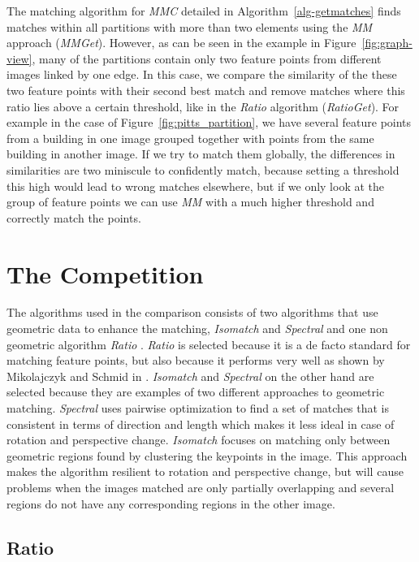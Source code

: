 The matching algorithm for \emph{MMC} detailed in 
Algorithm~\ref{alg-getmatches} finds matches within all partitions with 
more than two elements using the \emph{MM} approach (\emph{MMGet}).  
However, as can be seen in the example in Figure~\ref{fig:graph-view}, 
many of the partitions contain only two feature points from different 
images linked by one edge. In this case, we compare the similarity of 
the these two feature points with their second best match and remove 
matches where this ratio lies above a certain threshold, like in the 
\emph{Ratio} algorithm (\emph{RatioGet}).  For example in the case of 
Figure~\ref{fig:pitts_partition}, we have several feature points from a 
building in one image grouped together with points from the same 
building in another image. If we try to match them globally, the 
differences in similarities are two miniscule to confidently match, 
because setting a threshold this high would lead to wrong matches 
elsewhere, but if we only look at the group of feature points we can use 
\emph{MM} with a much higher threshold and correctly match the points.

\section{The Competition}

The algorithms used in the comparison consists of two algorithms that 
use geometric data to enhance the matching, \emph{Isomatch} 
\cite{das2008event} and \emph{Spectral} \cite{leordeanu2005spectral} and 
one non geometric algorithm \emph{Ratio} \cite{lowe2004sift}.  
\emph{Ratio} is selected because it is a de facto standard for matching 
feature points, but also because it performs very well as shown by 
Mikolajczyk and Schmid in \cite{mikolajczyk2005performance}.  
\emph{Isomatch} and \emph{Spectral} on the other hand are selected 
because they are examples of two different approaches to geometric 
matching. \emph{Spectral} uses pairwise optimization to find a set of 
matches that is consistent in terms of direction and length which makes 
it less ideal in case of rotation and perspective change. 
\emph{Isomatch} focuses on matching only between geometric regions found 
by clustering the keypoints in the image.  This approach makes the 
algorithm resilient to rotation and perspective change, but will cause 
problems when the images matched are only partially overlapping and 
several regions do not have any corresponding regions in the other 
image.

\subsection{Ratio}
\label{ss:ratio}

